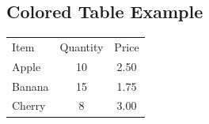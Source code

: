 \documentclass[12pt, a4paper]{article}
\begin{document}
\begin{english}

\section*{Colored Table Example}

\begin{tabular}{lcc}
  \rowcolor{gray!20}
  Item    & Quantity & Price \\
  Apple   & 10       & 2.50  \\
  \rowcolor{blue!15}
  Banana  & 15       & 1.75  \\
  Cherry  & 8        & \cellcolor{yellow!40}3.00 \\
\end{tabular}

\end{english}
\end{document}

